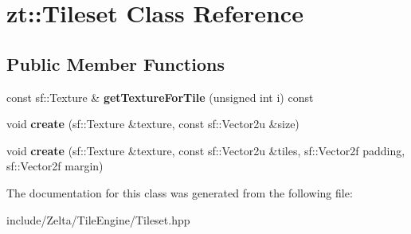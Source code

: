 \hypertarget{classzt_1_1_tileset}{}\section{zt\+:\+:Tileset Class Reference}
\label{classzt_1_1_tileset}
\subsection*{Public Member Functions}
\begin{DoxyCompactItemize}
\item 
\mbox{\label{classzt_1_1_tileset_aedae616d1a77443e22f6e1613946ec1b}} 
const sf\+::\+Texture \& {\bfseries get\+Texture\+For\+Tile} (unsigned int i) const
\item 
\mbox{\label{classzt_1_1_tileset_a6400f74fa3c1d51235715b07c743ed90}} 
void {\bfseries create} (sf\+::\+Texture \&texture, const sf\+::\+Vector2u \&size)
\item 
\mbox{\label{classzt_1_1_tileset_a19192046cbbe4f09d05058ca442a5360}} 
void {\bfseries create} (sf\+::\+Texture \&texture, const sf\+::\+Vector2u \&tiles, sf\+::\+Vector2f padding, sf\+::\+Vector2f margin)
\end{DoxyCompactItemize}


The documentation for this class was generated from the following file\+:\begin{DoxyCompactItemize}
\item 
include/\+Zelta/\+Tile\+Engine/Tileset.\+hpp\end{DoxyCompactItemize}
